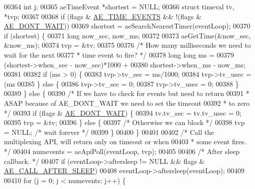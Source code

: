 \begin{DoxyCode}
00364         \textcolor{keywordtype}{int} j;
00365         aeTimeEvent *shortest = NULL;
00366         \textcolor{keyword}{struct} timeval tv, *tvp;
00367 
00368         \textcolor{keywordflow}{if} (flags & \hyperlink{ae_8h_acdc6c5c42302bc81959ed645b22800aa}{AE\_TIME\_EVENTS} && !(flags & \hyperlink{ae_8h_a95ce6d5997d5b55cef5e1977dc80af28}{AE\_DONT\_WAIT}))
00369             shortest = aeSearchNearestTimer(eventLoop);
00370         \textcolor{keywordflow}{if} (shortest) \{
00371             \textcolor{keywordtype}{long} now\_sec, now\_ms;
00372 
00373             aeGetTime(&now\_sec, &now\_ms);
00374             tvp = &tv;
00375 
00376             \textcolor{comment}{/* How many milliseconds we need to wait for the next}
00377 \textcolor{comment}{             * time event to fire? */}
00378             \textcolor{keywordtype}{long} \textcolor{keywordtype}{long} ms =
00379                 (shortest->when\_sec - now\_sec)*1000 +
00380                 shortest->when\_ms - now\_ms;
00381 
00382             \textcolor{keywordflow}{if} (ms > 0) \{
00383                 tvp->tv\_sec = ms/1000;
00384                 tvp->tv\_usec = (ms %
00385             \} \textcolor{keywordflow}{else} \{
00386                 tvp->tv\_sec = 0;
00387                 tvp->tv\_usec = 0;
00388             \}
00389         \} \textcolor{keywordflow}{else} \{
00390             \textcolor{comment}{/* If we have to check for events but need to return}
00391 \textcolor{comment}{             * ASAP because of AE\_DONT\_WAIT we need to set the timeout}
00392 \textcolor{comment}{             * to zero */}
00393             \textcolor{keywordflow}{if} (flags & \hyperlink{ae_8h_a95ce6d5997d5b55cef5e1977dc80af28}{AE\_DONT\_WAIT}) \{
00394                 tv.tv\_sec = tv.tv\_usec = 0;
00395                 tvp = &tv;
00396             \} \textcolor{keywordflow}{else} \{
00397                 \textcolor{comment}{/* Otherwise we can block */}
00398                 tvp = NULL; \textcolor{comment}{/* wait forever */}
00399             \}
00400         \}
00401 
00402         \textcolor{comment}{/* Call the multiplexing API, will return only on timeout or when}
00403 \textcolor{comment}{         * some event fires. */}
00404         numevents = aeApiPoll(eventLoop, tvp);
00405 
00406         \textcolor{comment}{/* After sleep callback. */}
00407         \textcolor{keywordflow}{if} (eventLoop->aftersleep != NULL && flags & \hyperlink{ae_8h_a7fc929b2d363fc270b311f09d5048cca}{AE\_CALL\_AFTER\_SLEEP})
00408             eventLoop->aftersleep(eventLoop);
00409 
00410         \textcolor{keywordflow}{for} (j = 0; j < numevents; j++) \{

\end{DoxyCode}
